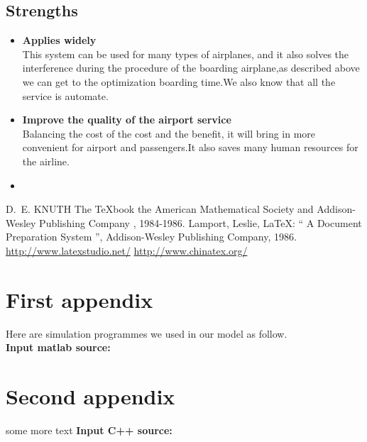 \documentclass{mcmthesis}
\begin{document}
\subsection{Strengths}
\begin{itemize}
\item \textbf{Applies widely}\\
This  system can be used for many types of airplanes, and it also
solves the interference during  the procedure of the boarding
airplane,as described above we can get to the  optimization
boarding time.We also know that all the service is automate.
\item \textbf{Improve the quality of the airport service}\\
Balancing the cost of the cost and the benefit, it will bring in
more convenient  for airport and passengers.It also saves many
human resources for the airline. \item \textbf{}
\end{itemize}

\begin{thebibliography}{99}
 D.~E. KNUTH   The \TeX{}book  the American
Mathematical Society and Addison-Wesley
Publishing Company , 1984-1986.
Lamport, Leslie,  \LaTeX{}: `` A Document Preparation System '',
Addison-Wesley Publishing Company, 1986.
\url{http://www.latexstudio.net/}
\url{http://www.chinatex.org/}
\end{thebibliography}

\begin{appendices}

\section{First appendix}

\lipsum[13]

Here are simulation programmes we used in our model as follow.\\

\textbf{\textcolor[rgb]{0.98,0.00,0.00}{Input matlab source:}}


\section{Second appendix}

some more text \textcolor[rgb]{0.98,0.00,0.00}{\textbf{Input C++ source:}}


\end{appendices}
\end{document}
